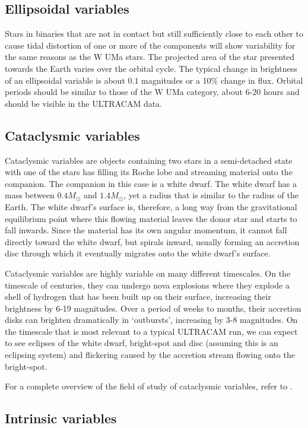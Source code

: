 \subsection{Ellipsoidal variables}
Stars in binaries that are not in contact but still sufficiently close to each other to cause tidal distortion of one or more of the components will show variability for the same reasons as the {W UMa} stars. The projected area of the star presented towards the Earth varies over the orbital cycle. The typical change in brightness of an ellipsoidal variable is about 0.1 magnitudes or a 10\% change in flux. Orbital periods should be similar to those of the {W UMa} category, about 6-20 hours and should be visible in the ULTRACAM data. 

\subsection{Cataclysmic variables}
Cataclysmic variables are objects containing two stars in a semi-detached state with one of the stars has filling its Roche lobe and streaming material onto the companion. The companion in this case is a white dwarf. The white dwarf has a mass between $0.4 M_{\odot}$ and $1.4 M_{\odot}$, yet a radius that is similar to the radius of the Earth. The white dwarf's surface is, therefore, a long way from the gravitational equilibrium point where this flowing material leaves the donor star and starts to fall inwards. Since the material has its own angular momentum, it cannot fall directly toward the white dwarf, but spirals inward, usually forming an accretion disc through which it eventually migrates onto the white dwarf's surface. 

Cataclysmic variables are highly variable on many different timescales. On the timescale of centuries, they can undergo nova explosions where they explode a shell of hydrogen that has been built up on their surface, increasing their brightness by 6-19 magnitudes. Over a period of weeks to months, their accretion disks can brighten dramatically in `outbursts', increasing by 3-8 magnitudes. On the timescale that is most relevant to a typical ULTRACAM run, we can expect to see eclipses of the white dwarf, bright-spot and disc (assuming this is an eclipsing system) and flickering caused by the accretion stream flowing onto the bright-spot. 

For a complete overview of the field of study of cataclysmic variables, refer to \citet{WarnerBook}. 

\subsection{Intrinsic variables}

